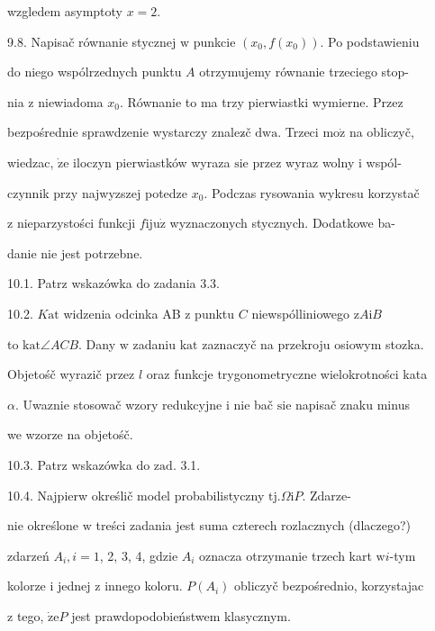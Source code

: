 \documentclass[a4paper,12pt]{article}
\begin{document}
wzgledem asymptoty $x=2.$

9.8. Napisač równanie stycznej $\mathrm{w}$ punkcie $(x_{0},f(x_{0}))$. Po podstawieniu

do niego wspólrzednych punktu $A$ otrzymujemy równanie trzeciego stop-

nia $\mathrm{z}$ niewiadoma $x_{0}$. Równanie to ma trzy pierwiastki wymierne. Przez

bezpośrednie sprawdzenie wystarczy znalez$\acute{}$č $\mathrm{d}\mathrm{w}\mathrm{a}$. Trzeci $\mathrm{m}\mathrm{o}\dot{\mathrm{z}}$ na obliczyč,

wiedzac, $\dot{\mathrm{z}}\mathrm{e}$ iloczyn pierwiastków wyraza $\mathrm{s}\mathrm{i}\mathrm{e}$ przez wyraz wolny $\mathrm{i}$ wspól-

czynnik przy najwyzszej potedze $x_{0}$. Podczas rysowania wykresu korzystač

$\mathrm{z}$ nieparzystości funkcji $f \mathrm{i}\mathrm{j}\mathrm{u}\dot{\mathrm{z}}$ wyznaczonych stycznych. Dodatkowe ba-

danie nie jest potrzebne.

10.1. Patrz wskazówka do zadania 3.3.

10.2. $K\mathrm{a}\mathrm{t}$ widzenia odcinka AB $\mathrm{z}$ punktu $C$ niewspólliniowego $\mathrm{z}A\mathrm{i}B$

to $\mathrm{k}\mathrm{a}\mathrm{t}\angle ACB$. Dany $\mathrm{w}$ zadaniu $\mathrm{k}\mathrm{a}\mathrm{t}$ zaznaczyč na przekroju osiowym stozka.

Objetośč wyrazič przez $l$ oraz funkcje trygonometryczne wielokrotności kata

$\alpha$. Uwaznie stosowač wzory redukcyjne $\mathrm{i}$ nie bač $\mathrm{s}\mathrm{i}\mathrm{e}$ napisač znaku minus

we wzorze na objetośč.

10.3. Patrz wskazówka do $\mathrm{z}\mathrm{a}\mathrm{d}$. 3.1.

10.4. Najpierw określič model probabilistyczny $\mathrm{t}\mathrm{j}. \Omega \mathrm{i} P$. Zdarze-

nie określone $\mathrm{w}$ treści zadania jest suma czterech rozlacznych (dlaczego?)

zdarzeń $A_{i}, i=1$, 2, 3, 4, gdzie $A_{i}$ oznacza otrzymanie trzech kart $\mathrm{w}i$-tym

kolorze $\mathrm{i}$ jednej $\mathrm{z}$ innego koloru. $P(A_{i})$ obliczyč bezpośrednio, korzystajac

$\mathrm{z}$ tego, $\dot{\mathrm{z}}\mathrm{e}P$ jest prawdopodobieństwem klasycznym.
\end{document}
